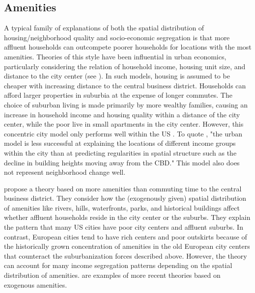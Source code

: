 \documentclass[a4paper,12pt]{article}
\begin{document}
\subsection{Amenities}

A typical family of explanations of both the spatial distribution of housing/neighborhood quality and socio-economic segregation is that more affluent households can outcompete poorer households for locations with the most amenities. Theories of this style have been influential in urban economics, particularly considering the relation of household income, housing unit size, and distance to the city center (see \cite{bruecknerLecturesUrbanEconomics2011}). In such models, housing is assumed to be cheaper with increasing distance to the central business district. Households can afford larger properties in suburbia at the expense of longer commutes. The choice of suburban living is made primarily by more wealthy families, causing an increase in household income and housing quality within a distance of the city center, while the poor live in small apartments in the city center. However, this concentric city model only performs well within the US \citep{bruecknerWhyCentralParis1999, quillianSocioeconomicSegregationLarge2016, gaigneWhoLivesWhere2022}. To quote \citet[55]{bruecknerLecturesUrbanEconomics2011}, "the urban model is less successful at explaining the locations of different income groups within the city than at predicting regularities in spatial structure such as the decline in building heights moving away from the CBD." This model also does not represent neighborhood change well.

\citet{bruecknerWhyCentralParis1999} propose a theory based on more amenities than commuting time to the central business district. They consider how the (exogenously given) spatial distribution of amenities like rivers, hills, waterfronts, parks, and historical buildings affect whether affluent households reside in the city center or the suburbs. They explain the pattern that many US cities have poor city centers and affluent suburbs. In contrast, European cities tend to have rich centers and poor outskirts because of the historically grown concentration of amenities in the old European city centers that counteract the suburbanization forces described above. However, the theory can account for many income segregation patterns depending on the spatial distribution of amenities. \citet{leeNaturalAmenitiesNeighbourhood2018, gaigneWhoLivesWhere2022} are examples of more recent theories based on exogenous amenities. 
\end{document}
